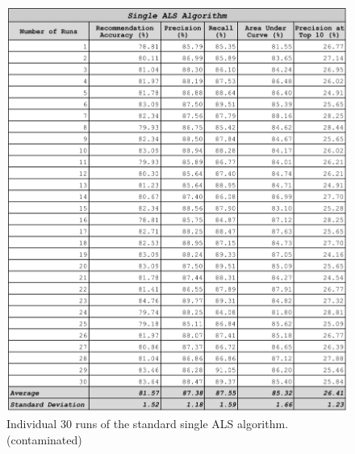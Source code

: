 \begin{appendices}

\chapter{} \label{appendix:results_table}

\begin{figure}
\centering
\includegraphics[scale=0.3]{appendices/single_als_30_runs.png}
\caption{Individual 30 runs of the standard single ALS algorithm. (contaminated)}
\label{fig:single_algorithm}
\end{figure}


\end{appendices}

